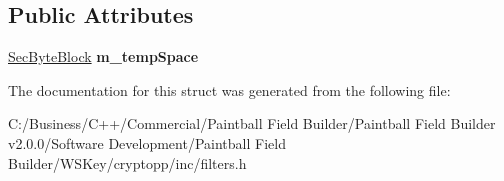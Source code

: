 \subsection*{Public Attributes}
\begin{DoxyCompactItemize}
\item 
\hypertarget{struct_filter_put_space_helper_ac50ca63d7b1a529a32e8596aa44df9c4}{
\hyperlink{class_sec_block}{SecByteBlock} {\bfseries m\_\-tempSpace}}
\label{struct_filter_put_space_helper_ac50ca63d7b1a529a32e8596aa44df9c4}

\end{DoxyCompactItemize}


The documentation for this struct was generated from the following file:\begin{DoxyCompactItemize}
\item 
C:/Business/C++/Commercial/Paintball Field Builder/Paintball Field Builder v2.0.0/Software Development/Paintball Field Builder/WSKey/cryptopp/inc/filters.h\end{DoxyCompactItemize}
